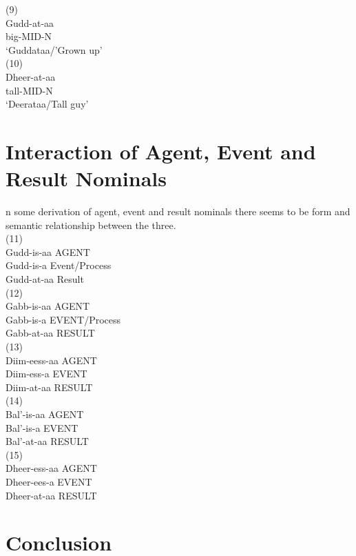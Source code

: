 \documentclass[11pt,a4paper]{article}
\begin{document}
(9)\\
\indent Gudd-at-aa\\
\indent big-MID-N\\
\indent ‘Guddataa/’Grown up’\\

(10)\\
\indent Dheer-at-aa\\
\indent tall-MID-N\\
\indent ‘Deerataa/Tall guy’\\

\section{Interaction of Agent, Event and Result Nominals}

n some derivation of agent, event and result nominals there seems to be form and semantic relationship between the three. \\

(11)\\
\indent Gudd-is-aa  AGENT\\
\indent Gudd-is-a  Event/Process\\
\indent Gudd-at-aa Result\\


(12)\\
\indent Gabb-is-aa AGENT\\
\indent Gabb-is-a  EVENT/Process\\
\indent Gabb-at-aa RESULT\\

(13)\\
\indent Diim-eess-aa AGENT\\
\indent Diim-ess-a EVENT\\
\indent Diim-at-aa RESULT\\

(14)\\
\indent Bal’-is-aa  AGENT\\
\indent Bal’-is-a  EVENT\\
\indent Bal’-at-aa RESULT\\

(15)\\
\indent Dheer-ess-aa AGENT\\
\indent Dheer-ees-a EVENT\\
\indent Dheer-at-aa RESULT\\




















\newpage

\section{Conclusion}
\end{document}
